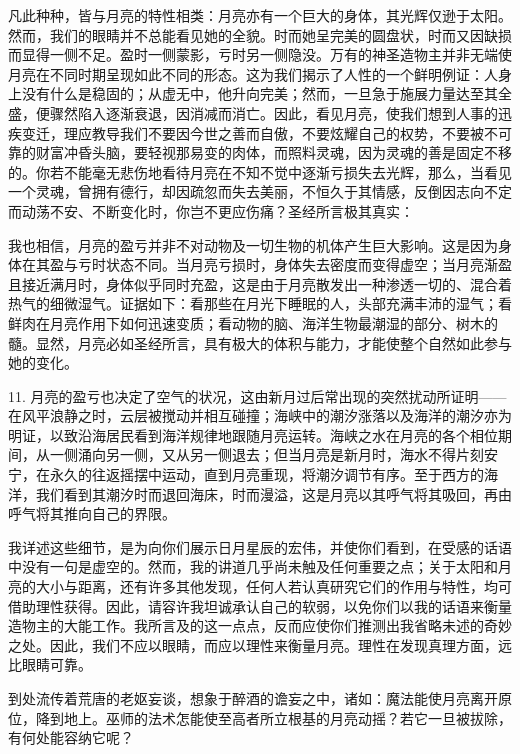 凡此种种，皆与月亮的特性相类：月亮亦有一个巨大的身体，其光辉仅逊于太阳。然而，我们的眼睛并不总能看见她的全貌。时而她呈完美的圆盘状，时而又因缺损而显得一侧不足。盈时一侧蒙影，亏时另一侧隐没。万有的神圣造物主并非无端使月亮在不同时期呈现如此不同的形态。这为我们揭示了人性的一个鲜明例证：人身上没有什么是稳固的；从虚无中，他升向完美；然而，一旦急于施展力量达至其全盛，便骤然陷入逐渐衰退，因消减而消亡。因此，看见月亮，使我们想到人事的迅疾变迁，理应教导我们不要因今世之善而自傲，不要炫耀自己的权势，不要被不可靠的财富冲昏头脑，要轻视那易变的肉体，而照料灵魂，因为灵魂的善是固定不移的。你若不能毫无悲伤地看待月亮在不知不觉中逐渐亏损失去光辉，那么，当看见一个灵魂，曾拥有德行，却因疏忽而失去美丽，不恒久于其情感，反倒因志向不定而动荡不安、不断变化时，你岂不更应伤痛？圣经所言极其真实：\par

我也相信，月亮的盈亏并非不对动物及一切生物的机体产生巨大影响。这是因为身体在其盈与亏时状态不同。当月亮亏损时，身体失去密度而变得虚空；当月亮渐盈且接近满月时，身体似乎同时充盈，这是由于月亮散发出一种渗透一切的、混合着热气的细微湿气。证据如下：看那些在月光下睡眠的人，头部充满丰沛的湿气；看鲜肉在月亮作用下如何迅速变质；看动物的脑、海洋生物最潮湿的部分、树木的髓。显然，月亮必如圣经所言，具有极大的体积与能力，才能使整个自然如此参与她的变化。\par

11. 月亮的盈亏也决定了空气的状况，这由新月过后常出现的突然扰动所证明——在风平浪静之时，云层被搅动并相互碰撞；海峡中的潮汐涨落以及海洋的潮汐亦为明证，以致沿海居民看到海洋规律地跟随月亮运转。海峡之水在月亮的各个相位期间，从一侧涌向另一侧，又从另一侧退去；但当月亮是新月时，海水不得片刻安宁，在永久的往返摇摆中运动，直到月亮重现，将潮汐调节有序。至于西方的海洋，我们看到其潮汐时而退回海床，时而漫溢，这是月亮以其呼气将其吸回，再由呼气将其推向自己的界限。\par

我详述这些细节，是为向你们展示日月星辰的宏伟，并使你们看到，在受感的话语中没有一句是虚空的。然而，我的讲道几乎尚未触及任何重要之点；关于太阳和月亮的大小与距离，还有许多其他发现，任何人若认真研究它们的作用与特性，均可借助理性获得。因此，请容许我坦诚承认自己的软弱，以免你们以我的话语来衡量造物主的大能工作。我所言及的这一点点，反而应使你们推测出我省略未述的奇妙之处。因此，我们不应以眼睛，而应以理性来衡量月亮。理性在发现真理方面，远比眼睛可靠。\par

到处流传着荒唐的老妪妄谈，想象于醉酒的谵妄之中，诸如：魔法能使月亮离开原位，降到地上。巫师的法术怎能使至高者所立根基的月亮动摇？若它一旦被拔除，有何处能容纳它呢？\par

